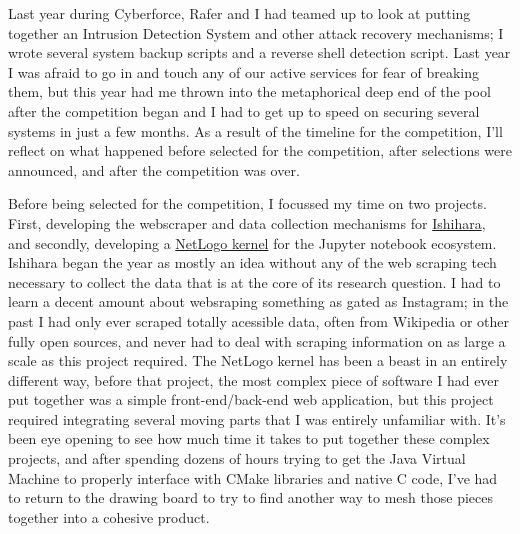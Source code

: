 



Last year during Cyberforce, Rafer and I had teamed up to look at putting together an Intrusion Detection System and other attack recovery mechanisms; I wrote several system backup scripts and a reverse shell detection script. Last year I was afraid to go in and touch any of our active services for fear of breaking them, but this year had me thrown into the metaphorical deep end of the pool after the competition began and I had to get up to speed on securing several systems in just a few months. As a result of the timeline for the competition, I'll reflect on what happened before selected for the competition, after selections were announced, and after the competition was over.

\vspace{7mm}

Before being selected for the competition, I focussed my time on two projects. First, developing the webscraper and data collection mechanisms for \href{https://uwcedar.io/Research/quirk/ishihara}{Ishihara}, and secondly, developing a \href{https://uwcedar.io/andey-robins/netlogopyter-notebook}{NetLogo kernel} for the Jupyter notebook ecosystem. Ishihara began the year as mostly an idea without any of the web scraping tech necessary to collect the data that is at the core of its research question. I had to learn a decent amount about websraping something as gated as Instagram; in the past I had only ever scraped totally acessible data, often from Wikipedia or other fully open sources, and never had to deal with scraping information on as large a scale as this project required. The NetLogo kernel has been a beast in an entirely different way, before that project, the most complex piece of software I had ever put together was a simple front-end/back-end web application, but this project required integrating several moving parts that I was entirely unfamiliar with. It's been eye opening to see how much time it takes to put together these complex projects, and after spending dozens of hours trying to get the Java Virtual Machine to properly interface with CMake libraries and native C code, I've had to return to the drawing board to try to find another way to mesh those pieces together into a cohesive product.

\vspace{7mm}

